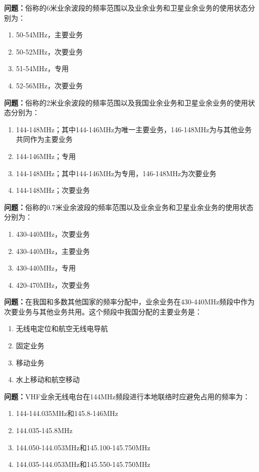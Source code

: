 \bigskip


\noindent\textbf{问题：}俗称的6米业余波段的频率范围以及业余业务和卫星业余业务的使用状态分别为：
\begin{enumerate}[label=\Alph*), leftmargin=3em]
\item 50-54MHz，主要业务
\item 50-52MHz，次要业务
\item 51-54MHz，专用
\item 52-56MHz，次要业务
\end{enumerate}

\bigskip


\noindent\textbf{问题：}俗称的2米业余波段的频率范围以及我国业余业务和卫星业余业务的使用状态分别为：
\begin{enumerate}[label=\Alph*), leftmargin=3em]
\item 144-148MHz；其中144-146MHz为唯一主要业务，146-148MHz为与其他业务共同作为主要业务
\item 144-146MHz；专用
\item 144-148MHz；其中144-146MHz为专用，146-148MHz为次要业务
\item 144-148MHz；次要业务
\end{enumerate}

\bigskip


\noindent\textbf{问题：}俗称的0.7米业余波段的频率范围以及业余业务和卫星业余业务的使用状态分别为：
\begin{enumerate}[label=\Alph*), leftmargin=3em]
\item 430-440MHz，次要业务
\item 430-440MHz，主要业务
\item 430-440MHz，专用
\item 420-470MHz，次要业务
\end{enumerate}

\bigskip


\noindent\textbf{问题：}在我国和多数其他国家的频率分配中，业余业务在430-440MHz频段中作为次要业务与其他业务共用。这个频段中我国分配的主要业务是：
\begin{enumerate}[label=\Alph*), leftmargin=3em]
\item 无线电定位和航空无线电导航
\item 固定业务
\item 移动业务
\item 水上移动和航空移动
\end{enumerate}

\bigskip


\noindent\textbf{问题：}VHF业余无线电台在144MHz频段进行本地联络时应避免占用的频率为：
\begin{enumerate}[label=\Alph*), leftmargin=3em]
\item 144-144.035MHz和145.8-146MHz
\item 144.035-145.8MHz
\item 144.050-144.053MHz和145.100-145.750MHz
\item 144.035-144.053MHz和145.550-145.750MHz
\end{enumerate}

